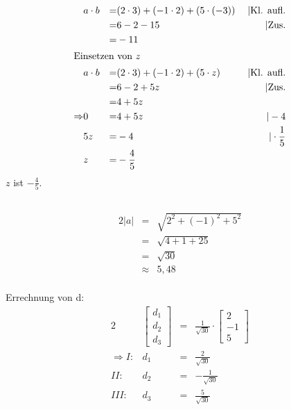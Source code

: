 \documentclass[10pt,a4paper,oneside,ngerman,numbers=noenddot]{scrartcl}
\begin{document}
\section{} %
\subsection{} %
\begin{alignat*}{3}
& a \cdot b &=& (2 \cdot 3) + (-1 \cdot 2) + (5 \cdot (-3)) & \;|\text{Kl. aufl.} \\
& &=& 6 - 2 - 15 & \;|\text{Zus.} \\
& &=& -11 & \\
\intertext{Einsetzen von $z$}
& a \cdot b &=& (2 \cdot 3) + (-1 \cdot 2) + (5 \cdot z) & \;|\text{Kl. aufl.} \\
& &=& 6 - 2 + 5z & \;|\text{Zus.} \\
& &=& 4 + 5z & \\
\Rightarrow & 0 &=& 4 + 5z & \;| -4 \\
& 5z &=& -4 & \;| \cdot \frac{1}{5} \\
& z &=& -\frac{4}{5} &
\end{alignat*}
$z$ ist $-\frac{4}{5}$.
\subsection{} %
\begin{alignat*}{2}
|a| &=& \sqrt{2^{2} + (-1)^{2} + 5^{2}} \\
&=& \sqrt{4 + 1 + 25} \\
&=& \sqrt{30} \\
&\approx & 5,48
\end{alignat*}
\\
Errechnung von d:\\
\begin{alignat*}{2}
& \begin{bmatrix}
d_{1} \\
d_{2} \\
d_{3}
\end{bmatrix} &=& \frac{1}{\sqrt{30}} \cdot
\begin{bmatrix}
2 \\
-1 \\
5
\end{bmatrix} \\
\Rightarrow I: & d_{1} &=& \frac{2}{\sqrt{30}} \\
II: & d_{2} &=& -\frac{1}{\sqrt{30}} \\
III: & d_{3} &=& \frac{5}{\sqrt{30}}
\end{alignat*}
\end{document}
